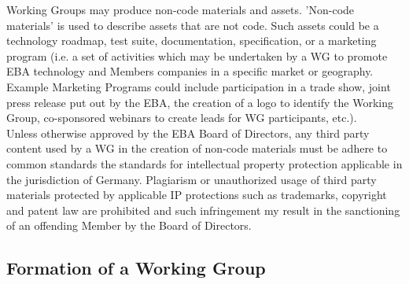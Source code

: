 \documentclass{article}
\begin{document}
Working Groups may produce non-code materials and assets.
 'Non-code materials' is used to describe assets that are not code. 
Such assets could be a technology roadmap, test suite, documentation, specification, or a marketing program (i.e. a set of activities which may be undertaken by a WG to promote EBA technology and Members companies in a specific market or geography. 
Example Marketing Programs could include participation in a trade show, joint press release put out by the EBA, the creation of a logo to identify the Working Group, co-sponsored webinars to create leads for WG participants, etc.). \\
Unless otherwise approved by the EBA Board of Directors, any third party content used by a WG in the creation of non-code materials must be adhere to common standards the standards for intellectual property protection applicable in the jurisdiction of Germany. 
Plagiarism or unauthorized usage of third party materials protected by applicable IP protections such as trademarks, copyright and patent law are prohibited and such infringement my result in the sanctioning of an offending Member by the Board of Directors.

\subsection{Formation of a Working Group}
\end{document}
